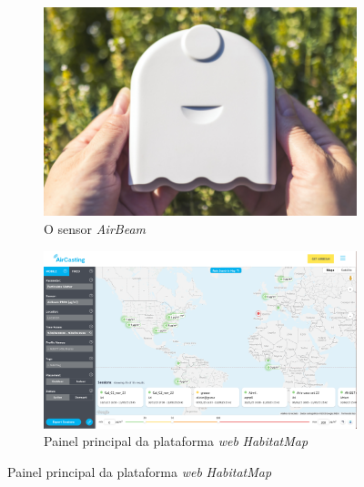 \begin{figure}[h]
    \centering
    \caption{A iniciativa \textit{Habitat Map} e o sensor \textit{AirBeam}}
    \begin{subfigure}{0.44\textwidth}
        \includegraphics[width=\textwidth]{chapters/1-MONITORAMENTO/Figuras/airbeam-buy-it-now.jpg}
        \caption{O sensor \textit{AirBeam}}
        \label{fig:air-beam}
    \end{subfigure}
    \hfill
    \begin{subfigure}{0.54\textwidth}
        \includegraphics[width=\textwidth]{chapters/1-MONITORAMENTO/Figuras/Habitat Map.png}
        \caption{Painel principal da plataforma \textit{web} \textit{HabitatMap}}
        \label{fig:habitat-map}
    \end{subfigure}
    \hfill
    \label{fig:habitat-map-initiative}
\end{figure}

